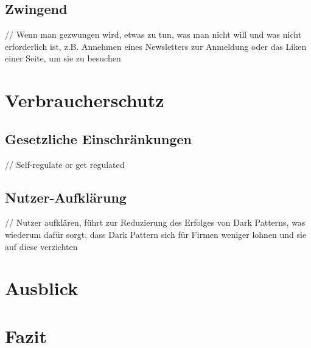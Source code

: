 \documentclass[conference,compsoc,final,a4paper]{IEEEtran}
\begin{document}
\subsection{Zwingend}
// Wenn man gezwungen wird, etwas zu tun, was man nicht will und was nicht erforderlich ist, z.B. Annehmen eines Newsletters zur Anmeldung oder das Liken einer Seite, um sie zu besuchen


\section{Verbraucherschutz}
\subsection{Gesetzliche Einschränkungen}
// Self-regulate or get regulated
\subsection{Nutzer-Aufklärung}
// Nutzer aufklären, führt zur Reduzierung des Erfolges von Dark Patterns, was wiederum dafür sorgt, dass Dark Pattern sich für Firmen weniger lohnen und sie auf diese verzichten

\section{Ausblick}

\section{Fazit}

\nocite{*}
\printbibliography
\end{document}
